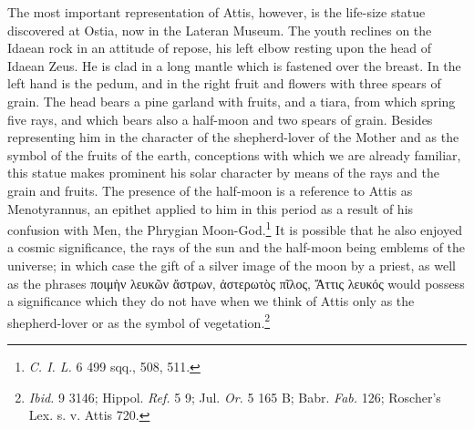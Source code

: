 \documentclass[a4paper, 11pt, oneside, polutonikogreek, english]{article}
\begin{document}
The most important representation of Attis, however, is the life-size statue discovered at Ostia, now in the Lateran Museum. The youth reclines on the Idaean rock in an attitude of repose, his left elbow resting upon the head of Idaean Zeus. He is clad in a long mantle which is fastened over the breast. In the left hand is the pedum, and in the right fruit and flowers with three spears of grain. The head bears a pine garland with fruits, and a tiara, from which spring five rays, and which bears also a half-moon and two spears of grain. Besides representing him in the character of the shepherd-lover of the Mother and as the symbol of the fruits of the earth, conceptions with which we are already familiar, this statue makes prominent his solar character by means of the rays and the grain and fruits. The presence of the half-moon is a reference to Attis as Menotyrannus, an epithet applied to him in this period as a result of his confusion with Men, the Phrygian Moon-God.\footnote{\emph{C. I. L.} 6 499 sqq., 508, 511.} It is possible that he also enjoyed a cosmic significance, the rays of the sun and the half-moon being emblems of the universe; in which case the gift of a silver image of the moon by a priest, as well as the phrases ποιμὴν λευκῶν ἄστρων, ἀστερωτὸς πῖλος, Ἄττις λευκός would possess a significance which they do not have when we think of Attis only as the shepherd-lover or as the symbol of vegetation.\footnote{\emph{Ibid.} 9 3146; Hippol. \emph{Ref.} 5 9; Jul. \emph{Or.} 5 165 B; Babr. \emph{Fab.} 126; Roscher's Lex. s. v. Attis 720.}
\end{document}

